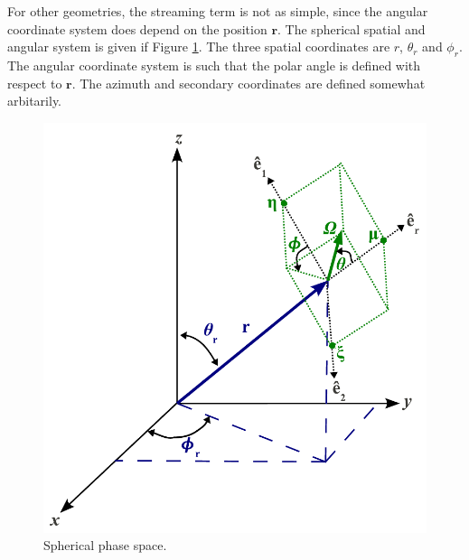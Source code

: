 For other geometries, the streaming term is not as simple, since the angular coordinate system does depend on the position $\mathbf{r}$.  The spherical spatial and angular system is given if Figure \ref{fig:spherical_phase_space}.  The three spatial coordinates are $r$, $\theta_r$ and $\phi_r$.  The angular coordinate system is such that the polar angle is defined with respect to $\mathbf{r}$.  The azimuth and secondary coordinates are defined somewhat arbitarily.

\begin{figure}[ht] 
    \centering
    \includegraphics[keepaspectratio, width = 3.0 in]{spherical_phase_space}
    \caption{Spherical phase space.}
    \label{fig:spherical_phase_space}
\end{figure}

